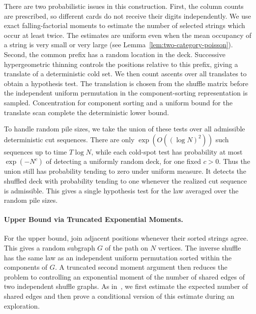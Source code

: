\documentclass[11pt]{article}
\numberwithin{equation}{section}
\theoremstyle{definition}
\theoremstyle{remark}
\newcommand{\1}{\mathbf 1}
\begin{document}
There are two probabilistic issues in this construction. First, the
column counts are prescribed, so different cards do not receive their
digits independently. We use exact falling-factorial moments to estimate
the number of selected strings which occur at least twice. The estimates
are uniform even when the mean occupancy of a string is very small or
very large (see Lemma~\ref{lem:two-category-poisson}). Second, the common
prefix has a random location in the deck. Successive hypergeometric
thinning controls the positions relative to this prefix, giving a
translate of a deterministic cold set. We then count ascents over all
translates to obtain a hypothesis test. The translation is chosen from
the shuffle matrix before the independent uniform permutation in the
component-sorting representation is sampled. Concentration for component
sorting and a uniform bound for the translate scan complete the
deterministic lower bound.

To handle random pile sizes, we take the union of these tests over all
admissible deterministic cut sequences. There are only
$\exp(O((\log N)^2))$ such sequences up to time $T\log N$, while
each cold-spot test has probability at most $\exp(-N^c)$ of detecting
a uniformly random deck, for one fixed $c>0$. Thus the union still
has probability tending to zero under uniform measure. It detects
the shuffled deck with probability tending to one whenever the
realized cut sequence is admissible. This gives a single hypothesis
test for the law averaged over the random pile sizes.

\paragraph{Upper Bound via Truncated Exponential Moments.}
For the upper bound, join adjacent positions whenever their sorted
strings agree. This gives a random subgraph $G$ of the path on $N$
vertices. The inverse shuffle has the same law as an independent uniform
permutation sorted within the components of $G$. A truncated second
moment argument then reduces the problem to controlling an exponential
moment of the number of shared edges of two independent shuffle graphs.
As in~\cite{SSW}, we first estimate the expected number of shared edges
and then prove a conditional version of this estimate during an
exploration.
\end{document}
